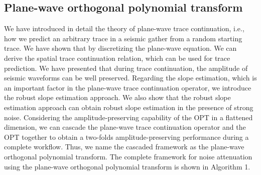 



\subsection{Plane-wave orthogonal polynomial transform}
We have introduced in detail the theory of plane-wave trace continuation, i.e., how we predict an arbitrary trace in a seismic gather from a random starting trace. We have shown that by discretizing the plane-wave equation. We can derive the spatial trace continuation relation, which can be used for trace prediction. We have presented that during trace continuation, the amplitude of seismic waveforms can be well preserved. Regarding the slope estimation, which is an important factor in the plane-wave trace continuation operator, we introduce the robust slope estimation approach. We also show that the robust slope estimation approach can obtain robust slope estimation in the presence of strong noise. Considering the amplitude-preserving capability of the OPT in a flattened dimension, we can cascade the plane-wave trace continuation operator and the OPT together to obtain a two-folds amplitude-preserving performance during a complete workflow. Thus, we name the cascaded framework as the plane-wave orthogonal polynomial transform. The complete framework for noise attenuation using the plane-wave orthogonal polynomial transform is shown in Algorithm 1. 

